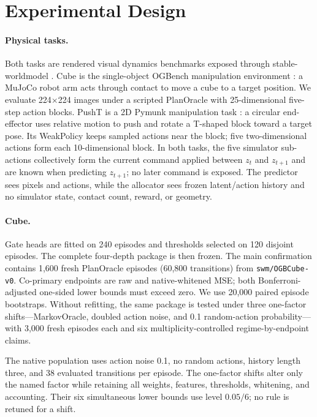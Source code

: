 \documentclass{article}
\begin{document}
\section{Experimental Design}

\paragraph{Physical tasks.}
Both tasks are rendered visual dynamics benchmarks exposed through stable-worldmodel \citep{maes2026stableworldmodel}. Cube is the single-object OGBench manipulation environment \citep{park2025ogbench}: a MuJoCo robot arm acts through contact to move a cube to a target position. We evaluate 224\(\times\)224 images under a scripted PlanOracle with 25-dimensional five-step action blocks. PushT is a 2D Pymunk manipulation task \citep{chi2023diffusion}: a circular end-effector uses relative motion to push and rotate a T-shaped block toward a target pose. Its WeakPolicy keeps sampled actions near the block; five two-dimensional actions form each 10-dimensional block. In both tasks, the five simulator sub-actions collectively form the current command applied between \(z_t\) and \(z_{t+1}\) and are known when predicting \(z_{t+1}\); no later command is exposed. The predictor sees pixels and actions, while the allocator sees frozen latent/action history and no simulator state, contact count, reward, or geometry.

\paragraph{Cube.}
Gate heads are fitted on 240 episodes and thresholds selected on 120 disjoint episodes. The complete four-depth package is then frozen. The main confirmation contains 1,600 fresh PlanOracle episodes (60,800 transitions) from \texttt{swm/OGBCube-v0}. Co-primary endpoints are raw and native-whitened MSE; both Bonferroni-adjusted one-sided lower bounds must exceed zero. We use 20,000 paired episode bootstraps. Without refitting, the same package is tested under three one-factor shifts---MarkovOracle, doubled action noise, and 0.1 random-action probability---with 3,000 fresh episodes each and six multiplicity-controlled regime-by-endpoint claims.

The native population uses action noise 0.1, no random actions, history length three, and 38 evaluated transitions per episode. The one-factor shifts alter only the named factor while retaining all weights, features, thresholds, whitening, and accounting. Their six simultaneous lower bounds use level \(0.05/6\); no rule is retuned for a shift.
\end{document}
